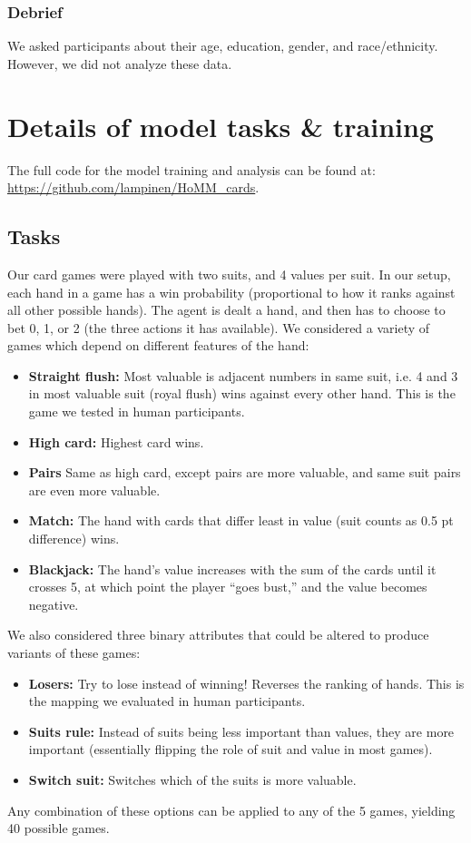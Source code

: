 \subsubsection{Debrief}
We asked participants about their age, education, gender, and race/ethnicity. However, we did not analyze these data.


\section{Details of model tasks \& training}\label{app:human:model_details}
The full code for the model training and analysis can be found at: \url{https://github.com/lampinen/HoMM_cards}.

\subsection{Tasks}

Our card games were played with two suits, and 4 values per suit. In our setup, each hand in a game has a win probability (proportional to how it ranks against all other possible hands). The agent is dealt a hand, and then has to choose to bet 0, 1, or 2 (the three actions it has available). We considered a variety of games which depend on different features of the hand:
\begin{itemize}
\item \textbf{Straight flush:} Most valuable is adjacent numbers in same suit, i.e. 4 and 3 in most valuable suit (royal flush) wins against every other hand. This is the game we tested in human participants.
\item \textbf{High card:} Highest card wins.
\item \textbf{Pairs} Same as high card, except pairs are more valuable, and same suit pairs are even more valuable.
\item \textbf{Match:} The hand with cards that differ least in value (suit counts as 0.5 pt difference) wins.
\item \textbf{Blackjack:} The hand's value increases with the sum of the cards until it crosses 5, at which point the player ``goes bust,'' and the value becomes negative.
\end{itemize}
We also considered three binary attributes that could be altered to produce variants of these games:
\begin{itemize}
\item \textbf{Losers:} Try to lose instead of winning! Reverses the ranking of hands. This is the mapping we evaluated in human participants.
\item \textbf{Suits rule:} Instead of suits being less important than values, they are more important (essentially flipping the role of suit and value in most games).
\item \textbf{Switch suit:} Switches which of the suits is more valuable.
\end{itemize}
Any combination of these options can be applied to any of the 5 games, yielding 40 possible games. \par

